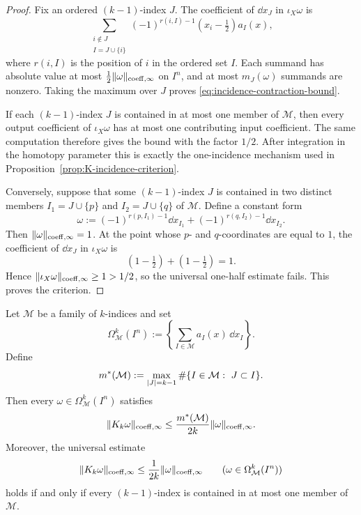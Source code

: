 \begin{proof}
Fix an ordered $(k-1)$-index $J$. The coefficient of $\dd x_J$ in
$\iota_X\omega$ is
\[
\sum_{\substack{i\notin J\\ I=J\cup\{i\}}}
(-1)^{r(i,I)-1}(x_i-\tfrac12)a_I(x),
\]
where $r(i,I)$ is the position of $i$ in the ordered set $I$. Each summand has
absolute value at most $\frac12\lVert \omega \rVert_{\mathrm{coeff},\infty}$ on $I^n$, and at
most $m_J(\omega)$ summands are nonzero. Taking the maximum over $J$ proves
\eqref{eq:incidence-contraction-bound}.

If each $(k-1)$-index $J$ is contained in at most one member of $\mathcal M$,
then every output coefficient of $\iota_X\omega$ has at most one contributing
input coefficient. The same computation therefore gives the bound with the
factor $1/2$. After integration in the homotopy parameter this is exactly the
one-incidence mechanism used in Proposition~\ref{prop:K-incidence-criterion}.

Conversely, suppose that some $(k-1)$-index $J$ is contained in two distinct
members $I_1=J\cup\{p\}$ and $I_2=J\cup\{q\}$ of $\mathcal M$. Define a constant
form
\[
\omega:=(-1)^{r(p,I_1)-1}\dd x_{I_1}
+(-1)^{r(q,I_2)-1}\dd x_{I_2}.
\]
Then $\lVert \omega \rVert_{\mathrm{coeff},\infty}=1$. At the point whose $p$- and
$q$-coordinates are equal to $1$, the coefficient of $\dd x_J$ in
$\iota_X\omega$ is
\[
(1-\tfrac12)+(1-\tfrac12)=1.
\]
Hence $\lVert \iota_X\omega \rVert_{\mathrm{coeff},\infty}\ge1>1/2$, so the universal
one-half estimate fails. This proves the criterion.

\end{proof}

\begin{proposition}
\label{prop:K-incidence-criterion}
Let $\mathcal M$ be a family of $k$-indices and set
\[
\Omega^k_{\mathcal M}(I^n):=
\left\{\sum_{I\in\mathcal M}a_I(x)\,\dd x_I\right\}.
\]
Define
\[
m^*(\mathcal M):=
\max_{\lvert J \rvert=k-1}\#\{I\in\mathcal M:\ J\subset I\}.
\]
Then every $\omega\in\Omega^k_{\mathcal M}(I^n)$ satisfies
\[
\lVert K_k\omega \rVert_{\mathrm{coeff},\infty}
\le
\frac{m^*(\mathcal M)}{2k}\lVert \omega \rVert_{\mathrm{coeff},\infty}.
\]
Moreover, the universal estimate
\[
\lVert K_k\omega \rVert_{\mathrm{coeff},\infty}
\le
\frac{1}{2k}\lVert \omega \rVert_{\mathrm{coeff},\infty}
\qquad
(\omega\in\Omega^k_{\mathcal M}(I^n))
\]
holds if and only if every $(k-1)$-index is contained in at most one member of
$\mathcal M$.
\end{proposition}

